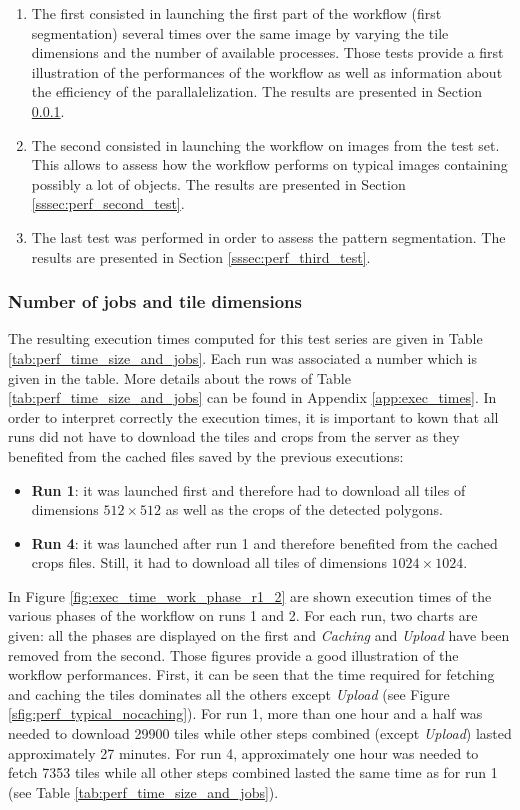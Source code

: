 \begin{enumerate}
	\item The first consisted in launching the first part of the workflow (first segmentation) several times over the same image by varying the tile dimensions and the number of available processes. Those tests provide a first illustration of the performances of the workflow as well as information about the efficiency of the parallalelization. The results are presented in Section \ref{sssec:perf_first_test_serie}.
	\item The second consisted in launching the workflow on images from the test set. This allows to assess how the workflow performs on typical images containing possibly a lot of objects. The results are presented in Section \ref{sssec:perf_second_test}.
	\item The last test was performed in order to assess the pattern segmentation. The results are presented in Section \ref{sssec:perf_third_test}.
\end{enumerate} 

\subsubsection{Number of jobs and tile dimensions}
\label{sssec:perf_first_test_serie}
The resulting execution times computed for this test series are given in Table \ref{tab:perf_time_size_and_jobs}. Each run was associated a number which is given in the table. More details about the rows of Table \ref{tab:perf_time_size_and_jobs} can be found in Appendix \ref{app:exec_times}. In order to interpret correctly the execution times, it is important to kown that all runs did not have to download the tiles and crops from the server as they benefited from the cached files saved by the previous executions: 

\begin{itemize}
	\item \textbf{Run 1}: it was launched first and therefore had to download all tiles of dimensions $512\times 512$ as well as the crops of the detected polygons.
	\item \textbf{Run 4}: it was launched after run 1 and therefore benefited from the cached crops files. Still, it had to download all tiles of dimensions $1024\times 1024$.
\end{itemize}

In Figure \ref{fig:exec_time_work_phase_r1_2} are shown execution times of the various phases of the workflow on runs 1 and 2. For each run, two charts are given: all the phases are displayed on the first and \textit{Caching} and \textit{Upload} have been removed from the second. Those figures provide a good illustration of the workflow performances. First, it can be seen that the time required for fetching and caching the tiles dominates all the others except \textit{Upload} (see Figure \ref{sfig:perf_typical_nocaching}). For run 1, more than one hour and a half was needed to download 29900 tiles while other steps combined (except \textit{Upload}) lasted approximately 27 minutes. For run 4, approximately one hour was needed to fetch 7353 tiles while all other steps combined lasted the same time as for run 1 (see Table \ref{tab:perf_time_size_and_jobs}). 

